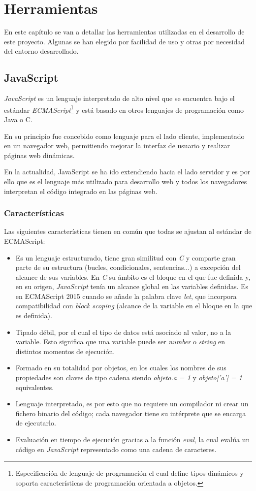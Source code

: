 \chapter{Herramientas}
\label{chap:herramientas}
En este capítulo se van a detallar las herramientas utilizadas en el desarrollo de este proyecto. Algunas se han elegido por facilidad de uso y otras por necesidad del entorno desarrollado.

\section{JavaScript}
\label{sec:js}
\textit{JavaScript} es un lenguaje interpretado de alto nivel que se encuentra bajo el estándar \textit{ECMAScript}\footnote{Especificación de lenguaje de programación el cual define tipos dinámicos y soporta características de programación orientada a objetos.} y está basado en otros lenguajes de programación como Java o C. 

En su principio fue concebido como lenguaje para el lado cliente, implementado en un navegador web, permitiendo mejorar la interfaz de usuario y realizar páginas web dinámicas.

En la actualidad, JavaScript se ha ido extendiendo hacia el lado servidor y es por ello que es el lenguaje más utilizado para desarrollo web y todos los navegadores interpretan el código integrado en las páginas web.
\subsection{Características}
Las siguientes características tienen en común que todas se ajustan al estándar de ECMAScript: 
\begin{itemize}
    \item Es un lenguaje estructurado, tiene gran similitud con \textit{C} y comparte gran parte de su estructura (bucles, condicionales, sentencias...) a excepción del alcance de sus variables. En \textit{C} su ámbito es el bloque en el que fue definida y, en su origen, \textit{JavaScript} tenía un alcance global en las variables definidas. Es en ECMAScript 2015 cuando se añade la palabra clave \textit{let}, que incorpora compatibilidad con \textit{block scoping} (alcance de la variable en el bloque en la que es definida). 
    \item Tipado débil, por el cual el tipo de datos está asociado al valor, no a la variable. Esto significa que una variable puede ser \textit{number} o \textit{string} en distintos momentos de ejecución. 
    \item Formado en su totalidad por objetos, en los cuales los nombres de sus propiedades son claves de tipo cadena siendo \textit{objeto.a = 1} y \textit{objeto['a'] = 1} equivalentes. 
    \item Lenguaje interpretado, es por esto que no requiere un compilador ni crear un fichero binario del código; cada navegador tiene su intérprete que se encarga de ejecutarlo.
    \item Evaluación en tiempo de ejecución gracias a la función \textit{eval}, la cual evalúa un código en \textit{JavaScript} representado como una cadena de caracteres. 

    
\end{itemize}
